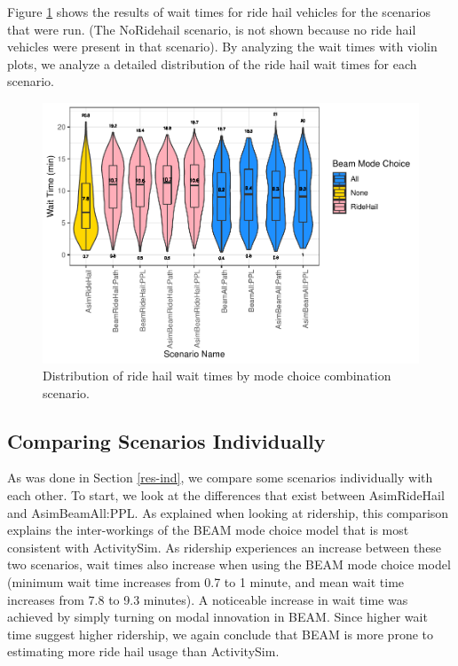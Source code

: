 \documentclass[12pt, oneside, openright]{byuthesis}
\begin{document}
Figure \ref{fig:waits} shows the results of wait times for ride hail vehicles for the scenarios that were run. (The NoRidehail scenario, is not shown because no ride hail vehicles were present in that scenario). By analyzing the wait times with violin plots, we analyze a detailed distribution of the ride hail wait times for each scenario.

\begin{figure}

{\centering \includegraphics{thesis_files/figure-latex/waits-1} 

}

\caption{Distribution of ride hail wait times by mode choice combination scenario.}\label{fig:waits}
\end{figure}

\hypertarget{comparing-scenarios-individually}{%
\subsection{Comparing Scenarios Individually}\label{comparing-scenarios-individually}}

As was done in Section \ref{res-ind}, we compare some scenarios individually with each other. To start, we look at the differences that exist between AsimRideHail and AsimBeamAll:PPL. As explained when looking at ridership, this comparison explains the inter-workings of the BEAM mode choice model that is most consistent with ActivitySim. As ridership experiences an increase between these two scenarios, wait times also increase when using the BEAM mode choice model (minimum wait time increases from 0.7 to 1 minute, and mean wait time increases from 7.8 to 9.3 minutes). A noticeable increase in wait time was achieved by simply turning on modal innovation in BEAM. Since higher wait time suggest higher ridership, we again conclude that BEAM is more prone to estimating more ride hail usage than ActivitySim.
\end{document}
